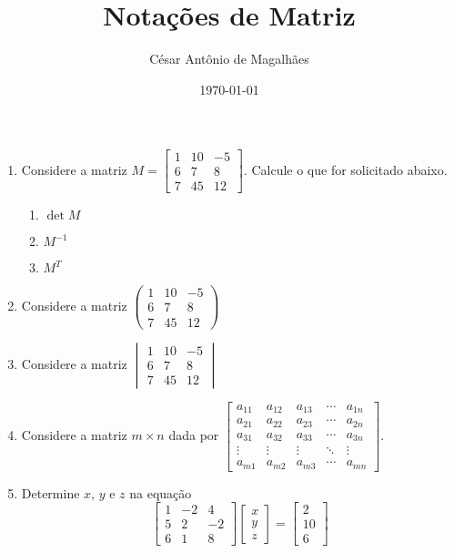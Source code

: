 \documentclass[12pt,a4paper]{article}
\title{Notações de Matriz}
\author{César Antônio de Magalhães}
\date{\today}
\begin{document}
	\begin{enumerate}
		\item Considere a matriz 
		$M = \begin{bmatrix}
			1 & 10 & -5 \\
			6 & 7 & 8 \\
			7 & 45 & 12
		\end{bmatrix}$. Calcule o que for solicitado abaixo.
		\begin{enumerate}
			\item $\det M$
			\item $M^{-1}$
			\item $M^T$
		\end{enumerate}
		\item Considere a matriz 
		$\begin{pmatrix}
			1 & 10 & -5 \\
			6 & 7 & 8 \\
			7 & 45 & 12
		\end{pmatrix}$
		\item Considere a matriz 
		$\begin{vmatrix}
			1 & 10 & -5 \\
			6 & 7 & 8 \\
			7 & 45 & 12
		\end{vmatrix}$
		\item Considere a matriz $m\times n$ dada por
		$\begin{bmatrix}
			a_{11} & a_{12} & a_{13} & \cdots & a_{1n} \\
			a_{21} & a_{22} & a_{23} & \cdots & a_{2n} \\
			a_{31} & a_{32} & a_{33} & \cdots & a_{3n} \\
			\vdots & \vdots & \vdots & \ddots & \vdots \\
			a_{m1} & a_{m2} & a_{m3} & \cdots & a_{mn}
		\end{bmatrix}$.
		\item Determine $x$, $y$ e $z$ na equação
		$$\begin{bmatrix}
			1 & -2 & 4 \\
			5 & 2 & -2 \\
			6 & 1 & 8
		\end{bmatrix}
		\begin{bmatrix}
			x \\ y \\ z
		\end{bmatrix} = 
		\begin{bmatrix}
			2 \\ 10 \\ 6
		\end{bmatrix}$$
	\end{enumerate}	
\end{document}
